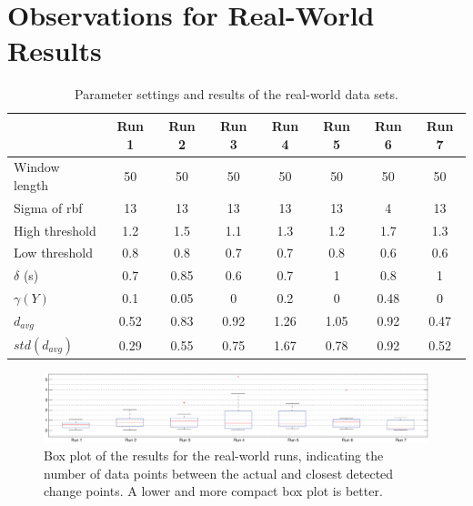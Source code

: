 
\chapter{Observations for Real-World Results} %

\label{AppendixA} %


\begin{table}
  \centering
  \caption[Results real world runs]{Parameter settings and results of the real-world data sets.}
  \begin{tabulary}{\textwidth}{|l|c|c|c|c|c|c|c|}
     & Run 1 & Run 2 & Run 3 & Run 4 & Run 5 & Run 6 & Run 7 \\
    \hline
    Window length & 50 & 50 & 50 & 50 & 50 & 50 & 50 \\
    \hline
    Sigma of \gls{rbf} & 13 & 13 & 13 & 13 & 13 & 4 & 13 \\
    \hline
    High threshold & 1.2 & 1.5 & 1.1 & 1.3 & 1.2 & 1.7 & 1.3 \\
    \hline
    Low threshold & 0.8 & 0.8 & 0.7 & 0.7 & 0.8 & 0.6 & 0.6 \\
    \hline
    $\delta$ (s) & 0.7 & 0.85 & 0.6 & 0.7 & 1 & 0.8 & 1 \\
    \hline
    \hline
    $\gamma(Y)$ & 0.1 & 0.05 & 0 & 0.2 & 0 & 0.48 & 0 \\
    \hline
    $d_{avg}$ & 0.52 & 0.83 & 0.92 & 1.26 & 1.05 & 0.92 & 0.47 \\
    \hline
    $std(d_{avg})$ & 0.29 & 0.55 & 0.75 & 1.67 & 0.78 & 0.92 & 0.52 \\
    \hline
  \end{tabulary}
  \label{tab:results_real_world}
\end{table}

\begin{figure}
\centering
  \includegraphics[width=1\textwidth]{./Figures/chapter6/data_collection/boxplot_results_real_world_runs.eps}
  \caption[Box plot results real-world runs individually optimized]{Box plot of the results for the real-world runs, indicating the number of data points between the actual and closest detected change points. A lower and more compact box plot is better.}
  \label{fig:boxplot_real_world_runs}
\end{figure}

